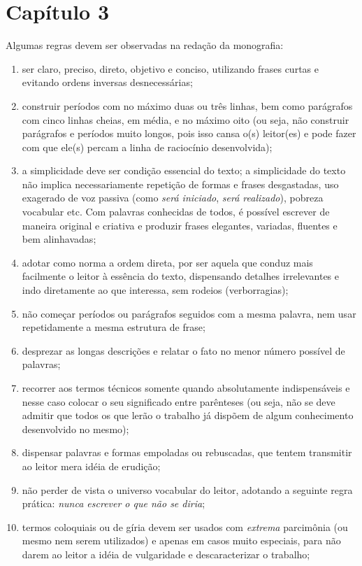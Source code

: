 
\chapter{Capítulo 3}

Algumas regras devem ser observadas na redação da monografia:
\begin{enumerate}
	\item ser claro, preciso, direto, objetivo e conciso, utilizando frases curtas e evitando ordens inversas desnecessárias;
	\item construir períodos com no máximo duas ou três linhas, bem como parágrafos com cinco linhas cheias, em média, e no máximo oito (ou seja, não construir parágrafos e períodos muito longos, pois isso cansa o(s) leitor(es) e pode fazer com que ele(s) percam a linha de raciocínio desenvolvida);
	\item a simplicidade deve ser condição essencial do texto; a simplicidade do texto não implica necessariamente repetição de formas e frases desgastadas, uso exagerado de voz passiva (como \textit{será iniciado}, \textit{será realizado}), pobreza vocabular etc. Com palavras conhecidas de todos, é possível escrever de maneira original e criativa e produzir frases elegantes, variadas, fluentes e bem alinhavadas;
	\item adotar como norma a ordem direta, por ser aquela que conduz mais facilmente o leitor à essência do texto, dispensando detalhes irrelevantes e indo diretamente ao que interessa, sem rodeios (verborragias);
	\item não começar períodos ou parágrafos seguidos com a mesma palavra, nem usar repetidamente a mesma estrutura de frase;
	\item desprezar as longas descrições e relatar o fato no menor número possível de palavras;
	\item recorrer aos termos técnicos somente quando absolutamente indispensáveis e nesse caso colocar o seu significado entre parênteses (ou seja, não se deve admitir que todos os que lerão o trabalho já dispõem de algum conhecimento desenvolvido no mesmo);
	\item dispensar palavras e formas empoladas ou rebuscadas, que tentem transmitir ao leitor mera idéia de erudição;
	\item não perder de vista o universo vocabular do leitor, adotando a seguinte regra prática: \textit{nunca escrever o que não se diria};
	\item termos coloquiais ou de gíria devem ser usados com \textit{extrema} parcimônia (ou mesmo nem serem utilizados) e apenas em casos muito especiais, para não darem ao leitor a idéia de vulgaridade e descaracterizar o trabalho;

\end{enumerate}
